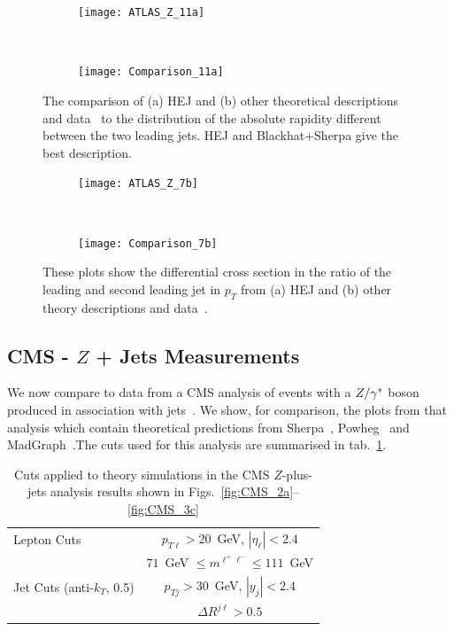 	\begin{figure}[h]
	  \centering
	  \begin{subfigure}[b]{0.48\textwidth}
	    \texttt{[image: ATLAS\_Z\_11a]}
	    \caption{}
	    \label{fig:HEJ_ATLAS_11a}
	  \end{subfigure}
	  ~
	  \begin{subfigure}[b]{0.48\textwidth}
	    \texttt{[image: Comparison\_11a]}
	    \caption{}
	    \label{fig:MC_ATLAS_11a}
	  \end{subfigure}
	  \caption{The comparison of (a) HEJ and (b) other theoretical descriptions and
	    data~\cite{Aad:2013ysa} to
	    the distribution of the absolute rapidity different between the two leading
	    jets.  HEJ and Blackhat+Sherpa give the best description.}
	  \label{fig:ATLAS_11a}

	  \begin{subfigure}[b]{0.48\textwidth}
	    \texttt{[image: ATLAS\_Z\_7b]}
	    \caption{}
	    \label{fig:HEJ_ATLAS_7b}
	  \end{subfigure}
	  ~
	  \begin{subfigure}[b]{0.48\textwidth}
	    \texttt{[image: Comparison\_7b]}
	    \caption{}
	    \label{fig:MC_ATLAS_7b}
	  \end{subfigure}
	  \caption{These plots show the differential cross section in the ratio of the leading
	     and second leading jet in $p_T$ from (a) HEJ and (b) other
	    theory descriptions and data~\cite{Aad:2013ysa}.}
	  \label{fig:ATLAS_7b}
	\end{figure}

	\subsection{CMS - $Z$ + Jets Measurements}
	\label{sub:CMS}

	We now compare to data from a CMS analysis of events with a $Z/\gamma^*$ boson produced
	in association with jets~\cite{Khachatryan:2014zya}.  We show, for comparison,
	the plots from that analysis which contain theoretical predictions from
	Sherpa~\cite{Gleisberg:2008ta,Hoeche:2012yf}, Powheg~\cite{Alioli:2010qp} and
	MadGraph~\cite{Alwall:2014hca}.The cuts used for this analysis are summarised in
	tab.~\ref{tab:cmscuts}.

	\begin{table}[hbt]
	  \centering
	  \begin{tabular}{|l|c|}
	    \hline
	    Lepton Cuts & $p_{T\ell}>20$~GeV, \; $|\eta_\ell|<2.4$ \\
	    &\; $71$~GeV $\leq m^{\ell^+\ell^-} \leq
	      111$~GeV \\ \hline
	    Jet Cuts (anti-$k_T$, 0.5) & $p_{Tj}>30$~GeV, \; $|y_j|<2.4$ \\
	    & $\Delta R^{j\ell} >0.5$ \\
	\hline
	  \end{tabular}
	  \caption{Cuts applied to theory simulations in the CMS
	    $Z$-plus-jets analysis results shown in
	    Figs.~\ref{fig:CMS_2a}--\ref{fig:CMS_3c}}
	  \label{tab:cmscuts}
	\end{table}

